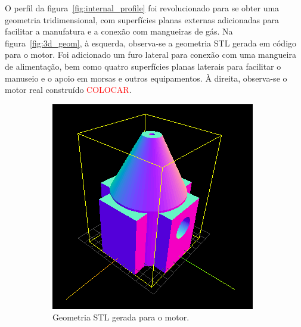 O perfil da figura~\ref{fig:internal_profile} foi revolucionado para se obter uma geometria tridimensional, com superfícies planas externas adicionadas para facilitar a manufatura e a conexão com mangueiras de gás. Na figura~\ref{fig:3d_geom}, à esquerda, observa-se a geometria STL gerada em código para o motor. Foi adicionado um furo lateral para conexão com uma mangueira de alimentação, bem como quatro superfícies planas laterais para facilitar o manuseio e o apoio em morsas e outros equipamentos. À direita, observa-se o motor real construído \textcolor{red}{COLOCAR}. 

\begin{figure}[htbp]
    \centering
    \begin{subfigure}{0.49\textwidth}
        \includegraphics[width=\textwidth]{img/motor_stl.png}
        \caption{Geometria STL gerada para o motor.}
    \end{subfigure}
    \begin{subfigure}{0.49\textwidth}

\end{subfigure}
\end{figure}
